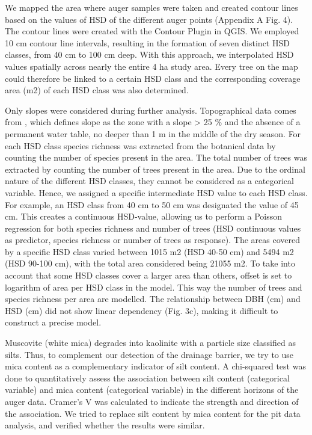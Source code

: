 \documentclass[fleqn,11pt]{latex/stylish_article} %
\begin{document}
We mapped the area where auger samples were taken and created contour lines based on the values of HSD of the different auger points (Appendix A Fig. 4). The contour lines were created with the Contour Plugin in QGIS. We employed 10 cm contour line intervals, resulting in the formation of seven distinct HSD classes, from 40 cm to 100 cm deep. With this approach, we interpolated HSD values spatially across nearly the entire 4 ha study area. Every tree on the map could therefore be linked to a certain HSD class and the corresponding coverage area (m2) of each HSD class was also determined.

Only slopes were considered during further analysis. Topographical data comes from \citep{dourdainGISDATADICTIONARY2022}, which defines slope as the zone with a slope \textgreater{} 25 \% and the absence of a permanent water table, no deeper than 1 m in the middle of the dry season. For each HSD class species richness was extracted from the botanical data by counting the number of species present in the area. The total number of trees was extracted by counting the number of trees present in the area. Due to the ordinal nature of the different HSD classes, they cannot be considered as a categorical variable. Hence, we assigned a specific intermediate HSD value to each HSD class. For example, an HSD class from 40 cm to 50 cm was designated the value of 45 cm. This creates a continuous HSD-value, allowing us to perform a Poisson regression for both species richness and number of trees (HSD continuous values as predictor, species richness or number of trees as response). The areas covered by a specific HSD class varied between 1015 m2 (HSD 40-50 cm) and 5494 m2 (HSD 90-100 cm), with the total area considered being 21055 m2. To take into account that some HSD classes cover a larger area than others, offset is set to logarithm of area per HSD class in the model. This way the number of trees and species richness per area are modelled. The relationship between DBH (cm) and HSD (cm) did not show linear dependency (Fig. 3c), making it difficult to construct a precise model.

Muscovite (white mica) degrades into kaolinite \citep{nicoliniEvidenceWeatheringStages2009} with a particle size classified as silts. Thus, to complement our detection of the drainage barrier, we try to use mica content as a complementary indicator of silt content. A chi-squared test was done to quantitatively assess the association between silt content (categorical variable) and mica content (categorical variable) in the different horizons of the auger data. Cramer's V was calculated to indicate the strength and direction of the association. We tried to replace silt content by mica content for the pit data analysis, and verified whether the results were similar.
\end{document}
